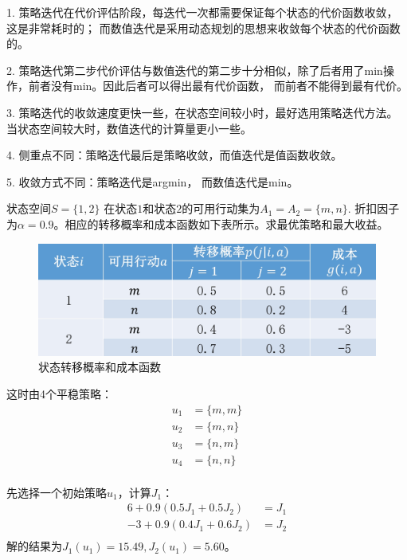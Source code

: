 \begin{note}
    1. 策略迭代在代价评估阶段，每迭代一次都需要保证每个状态的代价函数收敛，这是非常耗时的； 而数值迭代是采用动态规划的思想来收敛每个状态的代价函数的。

    2. 策略迭代第二步代价评估与数值迭代的第二步十分相似，除了后者用了min操作，前者没有min。因此后者可以得出最有代价函数， 而前者不能得到最有代价。

    3. 策略迭代的收敛速度更快一些，在状态空间较小时，最好选用策略迭代方法。当状态空间较大时，数值迭代的计算量更小一些。

    4. 侧重点不同：策略迭代最后是策略收敛，而值迭代是值函数收敛。

    5. 收敛方式不同：策略迭代是argmin， 而数值迭代是min。
\end{note}

\begin{example}
    状态空间$S=\{1,2\}$ 在状态$1$和状态$2$的可用行动集为$A_1 =
        A_2 = \{m,n\} $. 折扣因子为$\alpha = 0.9$。相应的转移概率和成本函数如下表所示。求最优策略和最大收益。

    \begin{figure}[h]
        \centering \includegraphics[scale=0.15]{pic/1.3.1.png}
        \caption{状态转移概率和成本函数}
    \end{figure}

    这时由4个平稳策略：
    \begin{equation}
        \begin{aligned}
            u_1 & = \{m,m\} \\
            u_2 & = \{m,n\} \\
            u_3 & = \{n,m\} \\
            u_4 & = \{n,n\} \\
        \end{aligned}
    \end{equation}

    先选择一个初始策略$u_1$，计算$J_1$：
    \begin{equation}
        \begin{aligned}
            6 + 0.9(0.5J_1 + 0.5J_2)  & = J_1 \\
            -3 + 0.9(0.4J_1 + 0.6J_2) & = J_2 \\
        \end{aligned}
    \end{equation}
    解的结果为$J_1(u_1) = 15.49 , J_2(u_1) = 5.60$。


\end{example}
